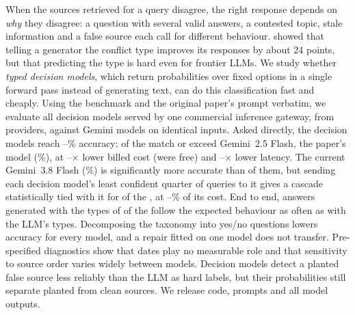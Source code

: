 When the sources retrieved for a query disagree, the right response depends on \emph{why} they disagree: a
question with several valid answers, a contested topic, stale information and a false source each call for
different behaviour. \citet{cattan2025dragged} showed that telling a generator the conflict type improves its
responses by about 24 points, but that predicting the type is hard even for frontier LLMs. We study whether
\emph{typed decision models}, which return probabilities over fixed options in a single forward pass instead of
generating text, can do this classification fast and cheaply. Using the \conflicts benchmark and the original
paper's prompt verbatim, we evaluate all \ndm decision models served by one commercial inference gateway, from
\nproviders providers, against Gemini models on identical inputs. Asked directly, the decision models reach
\dmaccmin--\dmaccmax\% accuracy; \natpar of the \ndm match or exceed Gemini~2.5 Flash, the paper's model
(\gtwofiveacc\%), at \costratiorefmin--\costratiorefmax$\times$ lower billed cost (\nfree were free) and
\latratiorefmin--\latratiorefmax$\times$ lower latency. The current Gemini~3.8 Flash (\gthreeeightacc\%) is significantly more accurate than \nworsenow of
them, but sending each decision model's least confident quarter of queries to it gives a cascade statistically tied
with it for \ncasctied of the \ndm, at \casctiedcostmin--\casctiedcostmax\% of its cost. End to end, answers
generated with the types of \eentied of the \ndm follow the expected behaviour as often as with the LLM's types. Decomposing the taxonomy into yes/no questions lowers
accuracy for every model, and a repair fitted on one model does not transfer. Pre-specified diagnostics show that
dates play no measurable role and that sensitivity to source order varies widely between models. Decision models
detect a planted false source less reliably than the LLM as hard labels, but their probabilities still separate
planted from clean sources. We release code, prompts and
all model outputs\releasenote.
